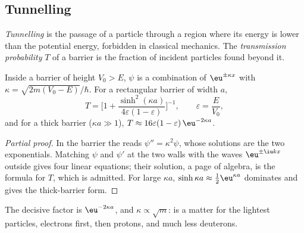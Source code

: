 \subsection*{Tunnelling}

\begin{definition}\label{def:b3:quantum-model-systems:tunnelling}
\emph{Tunnelling} is the passage of a particle through a
region where its energy is lower than the potential energy, forbidden in
classical mechanics. The \emph{transmission probability}
$T$ of a barrier is the fraction of incident particles found
beyond it.
\end{definition}

\begin{proposition}\label{prop:b3:quantum-model-systems:barrier}
Inside a barrier of height $V_0 > E$, $\psi$ is a combination of
$\eu^{\pm\kappa x}$ with $\kappa = \sqrt{2m(V_0 - E)}/\hbar$. For a rectangular
barrier of width $a$,
\[
T = \Big[1 + \frac{\sinh^2(\kappa a)}{4\varepsilon(1-\varepsilon)}\Big]^{-1},
\qquad \varepsilon = \frac{E}{V_0},
\]
and for a thick barrier ($\kappa a \gg 1$), $T \approx 16\varepsilon(1-\varepsilon)
\,\eu^{-2\kappa a}$.
\end{proposition}

\begin{proof}[Partial proof]
In the barrier the  reads $\psi'' = \kappa^2\psi$, whose
solutions are the two exponentials. Matching $\psi$ and $\psi'$ at the two
walls with the waves $\eu^{\pm\iu kx}$ outside gives four linear equations; their
solution, a page of algebra, is the formula for $T$, which is admitted. For
large $\kappa a$, $\sinh\kappa a \approx \frac12\eu^{\kappa a}$ dominates and
gives the thick-barrier form.
\end{proof}

The decisive factor is $\eu^{-2\kappa a}$, and $\kappa \propto \sqrt m$:
 is a matter for the lightest particles, electrons first, then
protons, and much less deuterons.

